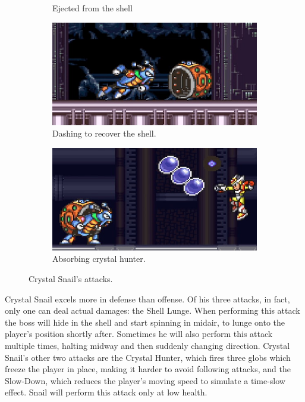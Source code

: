 \begin{figure}
\begin{subfigure}{0.45\linewidth}
		\caption{Ejected from the shell}
	\end{subfigure}
	\begin{subfigure}{0.45\linewidth}
		\centering
		\includegraphics[width=\linewidth]{figures/X2/Crystal_snail/Crystal_no_shell.png}
		\caption{Dashing to recover the shell.}
	\end{subfigure}
	\begin{subfigure}{0.45\linewidth}
		\centering
		\includegraphics[width=\linewidth]{figures/X2/Crystal_snail/Crystal_hunter_absorb.png}
		\caption{Absorbing crystal hunter.}
	\end{subfigure}
	\caption{Crystal Snail's attacks.}	
\end{figure}
Crystal Snail excels more in defense than offense. Of his three attacks, in fact, only one can deal actual damages: the Shell Lunge. When performing this attack the boss will hide in the shell and start spinning in midair, to lunge onto the player's position shortly after. Sometimes he will also perform this attack multiple times, halting midway and then suddenly changing direction. Crystal Snail's other two attacks are the Crystal Hunter, which fires three globs which freeze the player in place, making it harder to avoid following attacks, and the Slow-Down, which reduces the player's moving speed to simulate a time-slow effect. Snail will perform this attack only at low health.

